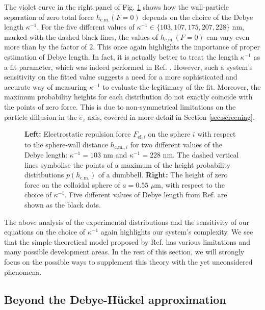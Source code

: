 \documentclass{master_thesis}
\begin{document}
The violet curve in the right panel of Fig. \ref{fig:influence_of_kappa} shows how the wall-particle separation of zero total force $h_{\textrm{c.m.}}(F = 0)$ depends on the choice of the Debye length $\kappa^{-1}$. For the five different values of $\kappa^{-1}\in\{ 103, 107, 175, 207, 228 \}$ nm, marked with the dashed black lines, the values of $h_{\textrm{c.m.}}(F = 0)$ can vary even more than by the factor of $2$. This once again highlights the importance of proper estimation of Debye length. In fact, it is actually better to treat the length $\kappa^{-1}$ as a fit parameter, which was indeed performed in Ref. \cite{verweij2021}. However, such a system's sensitivity on the fitted value suggests a need for a more sophisticated and accurate way of measuring $\kappa^{-1}$ to evaluate the legitimacy of the fit. Moreover, the maximum probability heights for each distribution do not exactly coincide with the points of zero force. This is due to non-symmetrical limitations on the particle diffusion in the $\hat{e}_z$ axis, covered in more detail in Section \ref{sec:screening}.

\begin{figure}
    \centering
    
    \caption{\textbf{Left:} Electrostatic repulsion force $F_{\textrm{el},i}$ on the sphere $i$ with respect to the sphere-wall distance $h_{\textrm{c.m.},i}$ for two different values of the Debye length: $\kappa^{-1}=103$ nm and $\kappa^{-1}=228$ nm. The dashed vertical lines symbolise the points of a maximum of the height probability distributions $p(h_{\textrm{c.m.}})$ of a dumbbell. \textbf{Right:} The height of zero force on the colloidal sphere of $a=0.55$ $\mu$m, with respect to the choice of $\kappa^{-1}$. Five different values of Debye length from Ref. \cite{verweij2021} are shown as the black dots.}
    \label{fig:influence_of_kappa}
\end{figure}

The above analysis of the experimental distributions and the sensitivity of our equations on the choice of $\kappa^{-1}$ again highlights our system's complexity. We see that the simple theoretical model proposed by Ref. \cite{verweij2021} has various limitations and many possible development areas. In the rest of this section, we will strongly focus on the possible ways to supplement this theory with the yet unconsidered phenomena.

\subsection{Beyond the Debye-Hückel approximation}
\end{document}
